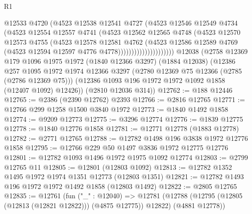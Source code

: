 \begin{lexlean}{R1}
\begin{coremodule}
                              @12533
                              @4720
                              (@4523
                                @12538
                                @12541
                                @4727
                                (@4523
                                  @12546
                                  @12549
                                  @4734
                                  (@4523
                                    @12554
                                    @12557
                                    @4741
                                    (@4523
                                      @12562
                                      @12565
                                      @4748
                                      (@4523
                                        @12570
                                        @12573
                                        @4755
                                        (@4523
                                          @12578
                                          @12581
                                          @4762
                                          (@4523
                                            @12586
                                            @12589
                                            @4769
                                            (@4523 @12594 @12597 @4776 @4778)))))))))))))))))))))
    @12038
    (@2758
      @12369
      @179
      @1096
      @1975
      @1972
      (@1840 @12366 @3297)
      (@1884 @12038)
      (@12386
        @257
        @1095
        @1972
        @1974
        @12366
        @3297
        (@2780 @12369 @75 @12366 (@2785 (@2786 @12369 @75)))
        (@12386 @1093 @196 @1972 @1972 @1092 @1858 (@12407 @1092) @12426))
      (@2810 @12036 @314))
@12762 := @188 @12446
@12765 := @2386 (@2390 @12762) @2393
@12766 := @2816 @12765
@12771 := @12766 @299 @1258 @1500 @3840 @1972
@12773 := @1840 @1492 @1858
@12774 := @9209 @12773
@12775 := @3296 @12774
@12776 := @1839 @12775
@12778 := @1840 @12776 @1858
@12781 := @12771 @12778 (@1883 @12778)
@12782 := @2771 @12765
@12788 := @12782 @1498 @196 @3838 @1972 @12776 @1858
@12795 := @12766 @229 @50 @1497 @3836 @1972 @12775 @12776
@12801 := @12782 @1093 @1496 @1972 @1975 @1092 @12774
@12803 := @2799 @12765 @11
@12805 := @12801 (@12803 @1092)
@12813 := @12782 @1352 @1495 @1972 @1974 @1351 @12773 (@12803 @1351)
@12821 := @12782 @1493 @196 @1972 @1972 @1492 @1858 (@12803 @1492)
@12822 := @2805 @12765
@12835 := @12761
    (fun ("_" : @12040) =>
    @12781 (@12788 (@12795 (@12805 (@12813 (@12821 @12822))) (@4875 @12775)) @12822) (@4881 @12778))

\end{coremodule}
\end{lexlean}
